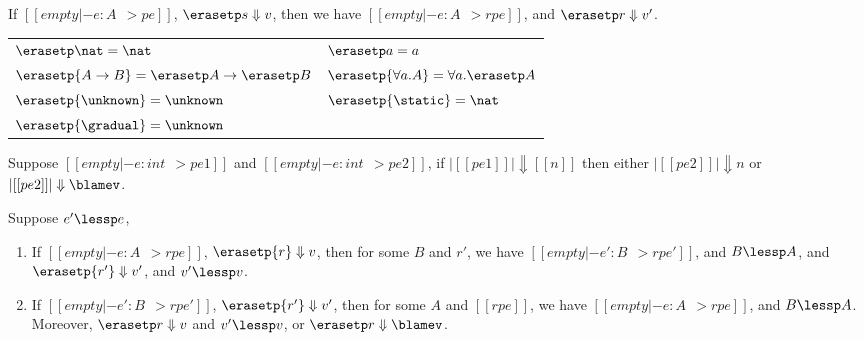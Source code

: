 \begin{conjecture} \label{lemma:repr}
  If $[[empty |- e : A ~~> pe]]$, $\erasetp s \Downarrow v$, then we
  have $[[empty |- e : A ~~> rpe]]$, and $\erasetp r \Downarrow v'$.
\end{conjecture}


\begin{definition}
  \begin{center}
\begin{tabular}{p{5cm}l}
  $\erasetp \nat = \nat $ &
  $\erasetp a = a $ \\
  $\erasetp {A \to B} = \erasetp A \to \erasetp B $ &
  $\erasetp {\forall a. A} = \forall a. \erasetp A$ \\
  $\erasetp {\unknown} = \unknown  $&
  $\erasetp {\static} = \nat  $\\
  $\erasetp {\gradual} = \unknown  $\\
\end{tabular}

  \end{center}
\end{definition}


\begin{corollary}
  Suppose $[[ empty |- e : int ~~> pe1 ]]$ and $[[ empty |- e : int ~~> pe2 ]]$, if $| [[ pe1 ]] | \Downarrow [[n]]$
  then either $ | [[  pe2  ]] | \Downarrow n$ or $ | [[  pe2  ]] | \Downarrow \blamev$.
\end{corollary}


\begin{conjecture}
  Suppose $e' \lessp e$,
  \begin{enumerate}
  \item If $[[empty |- e : A ~~> rpe]]$, $\erasetp {r} \Downarrow v$,
    then for some $B$ and $r'$, we have $[[ empty |- e' : B ~~> rpe']]$,
    and $B \lessp A$,
    and $\erasetp {r'} \Downarrow v'$,
    and $v' \lessp v$.
  \item If $[[empty |- e' : B ~~> rpe']]$, $\erasetp {r'} \Downarrow v'$,
    then for some $A$ and $[[rpe]]$, we have $ [[empty |- e : A ~~> rpe]]$,
    and $B \lessp A$. Moreover,
    $\erasetp r \Downarrow v$ and $v' \lessp v$,
    or $\erasetp r \Downarrow \blamev$.
  \end{enumerate}
\end{conjecture}



